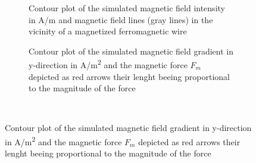 \begin{figure}[H]
            \begin{subfigure}{0.49\textwidth}
                  \flushleft
                  \caption{Contour plot of the simulated magnetic field intensity in A/m and magnetic field lines (gray lines) in the vicinity of a magnetized ferromagnetic wire}\label{fig:sw_mag_field}
          \end{subfigure}\hfill
        \begin{subfigure}{0.49\textwidth}
                \flushright
                \caption{Contour plot of the simulated magnetic field gradient in y-direction in A/m\textsuperscript{2} and the magnetic force $F_{m}$ depicted as red arrows their lenght beeing proportional to the magnitude of the force}\label{fig:mag_force_sw}
        \end{subfigure}
        \\
        

\end{figure}
